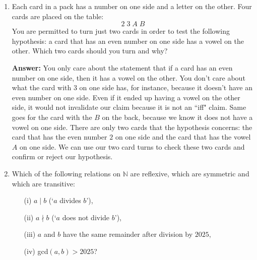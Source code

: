 \documentclass[11pt]{article}
\begin{document}
\begin{enumerate}
\rightline{$\Box$}
\item
Each card in a pack has a number on one side and a letter on the other. Four cards are
placed on the table:
\[ \boxed{2} \; \boxed{3} \; \boxed{A} \; \boxed{B}\]
You are permitted to turn just two cards in order to test the following hypothesis: a card that
has an even number on one side has a vowel on the other. Which two cards should you turn and why? 

\bigskip\textbf{Answer: } You only care about the statement that if a card has an even number on one side, then it has a vowel on the other. You don't care about what the card with 3 on one side has, for instance, because it doesn't have an even number on one side. Even if it ended up having a vowel on the other side, it would not invalidate our claim because it is not an ``iff" claim. Same goes for the card with the $B$ on the back, because we know it does not have a vowel on one side. There are only two cards that the hypothesis concerns: the card that has the even number $2$ on one side and the card that has the vowel $A$ on one side. We can use our two card turns to check these two cards and confirm or reject our hypothesis. 

\item
Which of the following relations on $\mathbb{N}$ are reflexive, which are symmetric and which are transitive:
\begin{itemize}
\item[(i)] $a \mid b$ (`$a$ divides $b$'),
\item[(ii)] $a \nmid b$ (`$a$ does not divide $b$'),
\item[(iii)] $a$ and $b$ have the same remainder after division by $2025$,
\item[(iv)] gcd$(a, b) > 2025$?
\end{itemize}

\end{enumerate}
\end{document}
